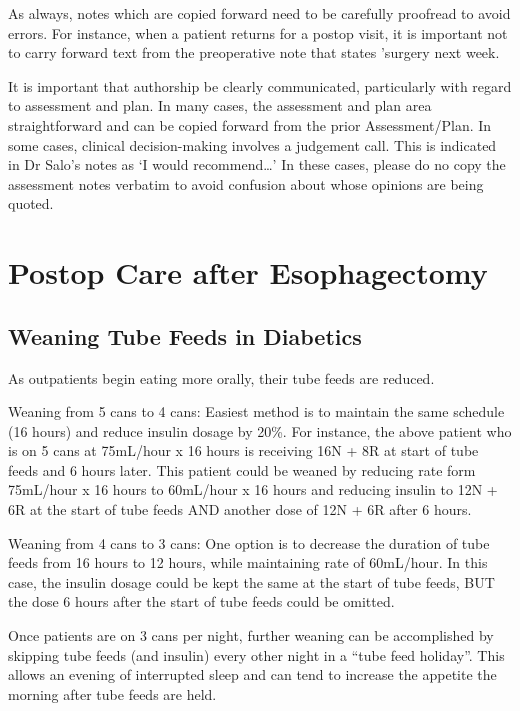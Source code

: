 \documentclass[
]{book}
\begin{document}
As always, notes which are copied forward need to be carefully proofread to avoid errors. For instance, when a patient returns for a postop visit, it is important not to carry forward text from the preoperative note that states 'surgery next week.

It is important that authorship be clearly communicated, particularly with regard to assessment and plan. In many cases, the assessment and plan area straightforward and can be copied forward from the prior Assessment/Plan. In some cases, clinical decision-making involves a judgement call. This is indicated in Dr Salo's notes as `I would recommend\ldots{}' In these cases, please do no copy the assessment notes verbatim to avoid confusion about whose opinions are being quoted.

\hypertarget{mie_postop}{%
\chapter{Postop Care after Esophagectomy}\label{mie_postop}}

\hypertarget{weaning-tube-feeds-in-diabetics}{%
\section{Weaning Tube Feeds in Diabetics}\label{weaning-tube-feeds-in-diabetics}}

As outpatients begin eating more orally, their tube feeds are reduced.

Weaning from 5 cans to 4 cans: Easiest method is to maintain the same schedule (16 hours) and reduce insulin dosage by 20\%. For instance, the above patient who is on 5 cans at 75mL/hour x 16 hours is receiving 16N + 8R at start of tube feeds and 6 hours later. This patient could be weaned by reducing rate form 75mL/hour x 16 hours to 60mL/hour x 16 hours and reducing insulin to 12N + 6R at the start of tube feeds AND another dose of 12N + 6R after 6 hours.

Weaning from 4 cans to 3 cans: One option is to decrease the duration of tube feeds from 16 hours to 12 hours, while maintaining rate of 60mL/hour. In this case, the insulin dosage could be kept the same at the start of tube feeds, BUT the dose 6 hours after the start of tube feeds could be omitted.

Once patients are on 3 cans per night, further weaning can be accomplished by skipping tube feeds (and insulin) every other night in a ``tube feed holiday''. This allows an evening of interrupted sleep and can tend to increase the appetite the morning after tube feeds are held.
\end{document}
